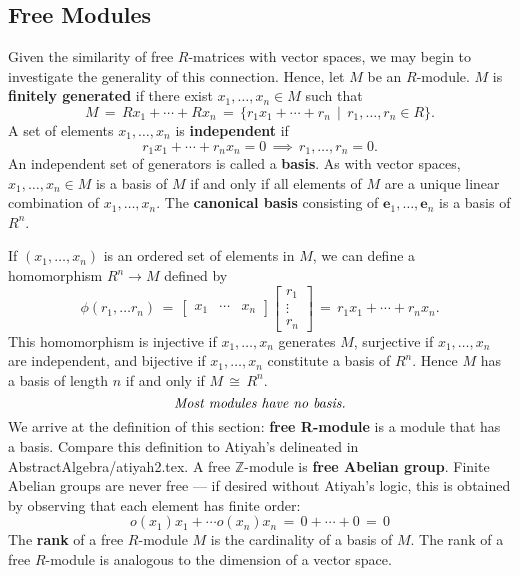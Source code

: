 \documentclass[11pt]{article}
\renewcommand{\vec}[1]{\mathbf{#1}}
\begin{document}

\subsection{Free Modules}

Given the similarity of free $R$-matrices with vector spaces, we may begin to investigate the generality of this connection. Hence, let $M$ be an $R$-module. $M$ is \textbf{finitely generated} if there exist $x_{1}, \ldots, x_{n} \in M$ such that
\[
  M \, = \, Rx_{1} + \cdots + Rx_{n} \, = \, \{ r_{1}x_{1} + \cdots + r_{n} \, \mid \, r_{1}, \ldots, r_{n} \in R \}.
\]
A set of elements $x_{1}, \ldots, x_{n}$ is \textbf{independent} if
\[
  r_{1}x_{1} + \cdots + r_{n}x_{n} = 0 \, \implies \, r_{1}, \ldots, r_{n} = 0.
\]
An independent set of generators is called a \textbf{basis}. As with vector spaces, $x_{1}, \ldots, x_{n} \in M$ is a basis of $M$ if and only if all elements of $M$ are a unique linear combination of $x_{1}, \ldots, x_{n}$. The \textbf{canonical basis} consisting of $\vec{e}_{1}, \ldots, \vec{e}_{n}$ is a basis of $R^{n}$.

\newpage

If $(x_{1}, \ldots, x_{n})$ is an ordered set of elements in $M$, we can define a homomorphism $R^{n} \to M$ defined by
\[
  \phi(r_{1}, \ldots r_{n}) \, = \, \begin{bmatrix} x_{1} & \cdots & x_{n} \end{bmatrix} \begin{bmatrix} r_{1} \\ \vdots \\ r_{n} \end{bmatrix} \, = \, r_{1}x_{1} + \cdots + r_{n}x_{n}.
\]
This homomorphism is injective if $x_{1}, \ldots, x_{n}$ generates $M$, surjective if $x_{1}, \ldots, x_{n}$ are independent, and bijective if $x_{1}, \ldots, x_{n}$ constitute a basis of $R^{n}$. Hence $M$ has a basis of length $n$ if and only if $M \, \cong \, R^{n}$. 
\[
  \text{\textit{Most modules have no basis.}}
\]
We arrive at the definition of this section: \textbf{free R-module} is a module that has a basis. Compare this definition to Atiyah's delineated in AbstractAlgebra/atiyah2.tex. A free $\mathbb{Z}$-module is \textbf{free Abelian group}. Finite Abelian groups are never free --- if desired without Atiyah's logic, this is obtained by observing that each element has finite order:
\[
  o(x_{1}) x_{1} + \cdots o(x_{n}) x_{n} \, = \, 0 + \cdots + 0 \, = \, 0
\]
The \textbf{rank} of a free $R$-module $M$ is the cardinality of a basis of $M$. The rank of a free $R$-module is analogous to the dimension of a vector space.
\end{document}
